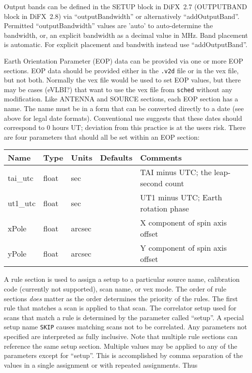 Output bands can be defined in the SETUP block in DiFX~2.7 (OUTPUTBAND block in DiFX~2.8) via ``outputBandwidth'' or alternatively ``addOutputBand''.
Permitted ``outputBandwidth'' values are 'auto' to auto-determine the bandwidth, or, an explicit bandwidth as a decimal value in MHz.
Band placement is automatic. For explicit placement and bandwith instead use ``addOutputBand''.

Earth Orientation Parameter (EOP) data can be provided via one or more EOP sections.
EOP data should be provided either in the {\tt .v2d} file or in the vex file, but not both.
Normally the vex file would be used to set EOP values, but there may be cases (eVLBI?) that want to use the vex file from {\tt sched} without any modification.
Like ANTENNA and SOURCE sections, each EOP section has a name.
The name must be in a form that can be converted directly to a date (see above for legal date formats).
Conventional use suggests that these dates should correspond to 0 hours UT; deviation from this practice is at the users risk.
There are four parameters that should all be set within an EOP section:

\begin{center}
\begin{tabular}{l l l l l}
\hline
Name		& Type	& Units		& Defaults	& Comments \\
\hline
tai\_utc	& float	& sec		&		& TAI minus UTC; the leap-second count  \\
ut1\_utc	& float	& sec		&		& UT1 minus UTC; Earth rotation phase \\
xPole		& float	& arcsec	&		& X component of spin axis offset \\
yPole		& float	& arcsec	&		& Y component of spin axis offset \\
\hline
\hline
\end{tabular}
\end{center}

A rule section is used to assign a setup to a particular source name, calibration code (currently not supported), scan name, or vex mode.
The order of rule sections {\em does} matter as the order determines the priority of the rules.
The first rule that matches a scan is applied to that scan.
The correlator setup used for scans that match a rule is determined by the parameter called ``setup''.
A special setup name {\tt SKIP} causes matching scans not to be correlated.
Any parameters not specified are interpreted as fully inclusive.
Note that multiple rule sections can reference the same setup section.
Multiple values may be applied to any of the parameters except for ``setup''.
This is accomplished by comma separation of the values in a single assignment or with repeated assignments.
Thus

